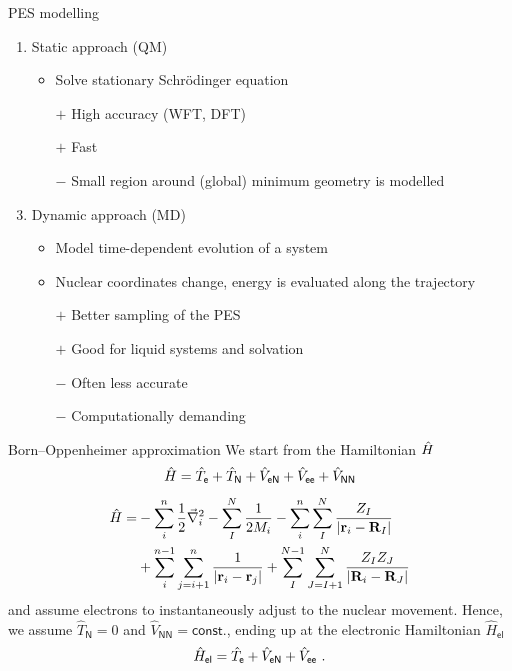 \documentclass[t]{beamer}
\begin{document}
	\begin{frame}{PES modelling}
	    \begin{enumerate}
	        \item Static approach (QM)
	        \begin{itemize}
	            \item Solve stationary Schrödinger equation
	            \item[$+$] High accuracy (WFT, DFT)
	            \item[$+$] Fast
	            \item[$-$] Small region around (global) minimum geometry is modelled
	        \end{itemize}
	        \item[]
	        \pause
	        \item Dynamic approach (MD)
	        \begin{itemize}
	            \item Model time-dependent evolution of a system
	            \item Nuclear coordinates change, energy is evaluated along the trajectory
	            \item[$+$] Better sampling of the PES
	            \item[$+$] Good for liquid systems and solvation
	            \item[$-$] Often less accurate
	            \item[$-$] Computationally demanding
	        \end{itemize}
	    \end{enumerate}
	\end{frame}
	\begin{frame}{Born--Oppenheimer approximation}
	    We start from the Hamiltonian $\Hat{H}$ \pause
	    \begin{equation*}
	        \Hat{H} = \Hat{T}_\mathsf{e} + \Hat{T}_\mathsf{N} + \Hat{V}_\mathsf{eN} + \Hat{V}_\mathsf{ee} + \Hat{V}_\mathsf{NN}  
	    \end{equation*}
	    \pause
	    \vspace{-1cm}
	    \begin{align*}
	          \Hat{H} = & - \sum_i^n \frac{1}{2} \vec{\nabla}_i^2 - \sum_I^N \frac{1}{2M_i} - \sum_i^n \sum_I^N \frac{Z_I}{\left| \mathbf{r}_i-\mathbf{R}_I \right|} \\
	          & + \sum_i^{n-1} \sum_{j=i+1}^n \frac{1}{\left| \mathbf{r}_i-\mathbf{r}_j \right|} + \sum_I^{N-1} \sum_{J=I+1}^N \frac{Z_I Z_J}{\left| \mathbf{R}_i-\mathbf{R}_J \right|}
	    \end{align*}
	    and assume electrons to instantaneously adjust to the nuclear movement. Hence, we assume $\hat{T}_\mathsf{N}=0$ and $\hat{V}_\mathsf{NN}=\mathsf{const.}$, ending up at the electronic Hamiltonian $\hat{H}_\mathsf{el}$ \pause
	    \begin{equation*}
	        \hat{H}_\mathsf{el} = \Hat{T}_\mathsf{e} + \Hat{V}_\mathsf{eN} + \Hat{V}_\mathsf{ee}~.
	    \end{equation*}
	\end{frame}
\end{document}

